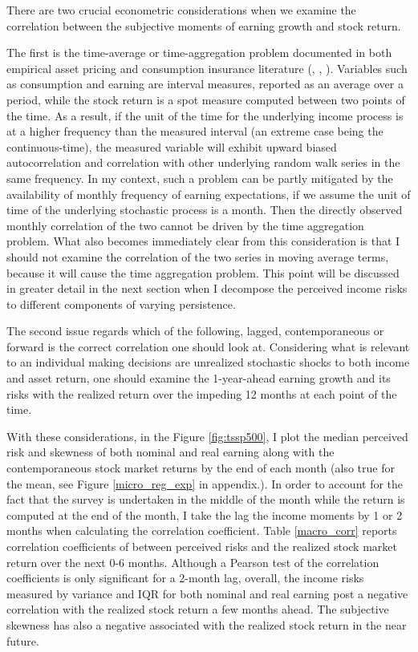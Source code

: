 \documentclass[12pt,notitlepage,onecolumn,aps,pra]{article}
\begin{document}
There are two crucial econometric considerations when we examine the
correlation between the subjective moments of earning growth and stock
return.

The first is the time-average or time-aggregation problem documented in
both empirical asset pricing and consumption insurance literature
(\cite{working_note_1960}, \cite{jagannathan_lazy_2007},
\cite{crawley_search_2019}). Variables such as consumption and earning
are interval measures, reported as an average over a period, while the
stock return is a spot measure computed between two points of the time.
As a result, if the unit of the time for the underlying income process
is at a higher frequency than the measured interval (an extreme case
being the continuous-time), the measured variable will exhibit upward
biased autocorrelation and correlation with other underlying random walk
series in the same frequency. In my context, such a problem can be
partly mitigated by the availability of monthly frequency of earning
expectations, if we assume the unit of time of the underlying stochastic
process is a month. Then the directly observed monthly correlation of
the two cannot be driven by the time aggregation problem. What also
becomes immediately clear from this consideration is that I should not
examine the correlation of the two series in moving average terms,
because it will cause the time aggregation problem. This point will be
discussed in greater detail in the next section when I decompose the
perceived income risks to different components of varying persistence.

The second issue regards which of the following, lagged, contemporaneous
or forward is the correct correlation one should look at. Considering
what is relevant to an individual making decisions are unrealized
stochastic shocks to both income and asset return, one should examine
the 1-year-ahead earning growth and its risks with the realized return
over the impeding 12 months at each point of the time.

With these considerations, in the Figure \ref{fig:tssp500}, I plot the
median perceived risk and skewness of both nominal and real earning
along with the contemporaneous stock market returns by the end of each
month (also true for the mean, see Figure \ref{micro_reg_exp} in
appendix.). In order to account for the fact that the survey is
undertaken in the middle of the month while the return is computed at
the end of the month, I take the lag the income moments by 1 or 2 months
when calculating the correlation coefficient. Table \ref{macro_corr}
reports correlation coefficients of between perceived risks and the
realized stock market return over the next 0-6 months. Although a
Pearson test of the correlation coefficients is only significant for a
2-month lag, overall, the income risks measured by variance and IQR for
both nominal and real earning post a negative correlation with the
realized stock return a few months ahead. The subjective skewness has
also a negative associated with the realized stock return in the near
future.
\end{document}
